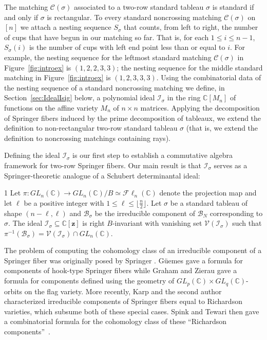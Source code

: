 \documentclass[11pt]{amsart}
\theoremstyle{remark}
\theoremstyle{remark}
\theoremstyle{definition}
\theoremstyle{definition}
\theoremstyle{definition}
\numberwithin{equation}{section}
\newcommand{\C}{\mathbb{C}}           %
\newcommand{\gs}{\sigma}
\newcommand{\cb}{\mathcal{B}}
\newcommand{\cc}{\mathcal{C}}
\newcommand{\ci}{\mathcal{I}}
\newcommand{\cv}{\mathcal{V}}
\newcommand{\SF}{\mathcal{B}}
\newcommand{\cupsigma}{\cc(\gs)}
\newcommand{\isigma}{\ci_\gs}
\newcommand{\Fl}{\mathcal{F}\ell}
\begin{document}
 
The matching $\cupsigma$ associated to a two-row standard tableau $\gs$ is standard if and only if $\gs$ is rectangular.  To every standard noncrossing matching $\cupsigma$ on $[n]$ we attach a nesting sequence $S_\gs$ that counts, from left to right, the number of cups that have begun in our matching so far. That is, for each $1\leq i \leq n-1$, $S_\gs(i)$ is the number of cups with left end point less than or equal to $i$. For example, the nesting sequence for the leftmost standard matching $\cupsigma$ in Figure~\ref{fig:introex} is $(1,2,2,3,3)$; the nesting sequence for the middle standard matching in Figure~\ref{fig:introex} is $(1,2,3,3,3)$. Using the combinatorial data of the nesting sequence of a standard noncrossing matching we define, in Section~\ref{sec:IdealIsig} below, a polynomial ideal $\ci_\gs$ in the ring $\C[M_n]$ of functions on the affine variety $M_n$ of $n\times n$ matrices. Applying the decomposition of Springer fibers induced by the prime decomposition of tableaux, we extend the definition to non-rectangular two-row standard tableau $\gs$ (that is, we extend the definition to noncrossing matchings containing rays). 



Defining the ideal $\ci_\gs$ is our first step to establish a commutative algebra framework for two-row Springer fibers.   Our main result is that $\isigma$ serves as a Springer-theoretic analogue of a Schubert determinantal ideal:

\begin{customthm}{1} \label{thm.intro}
Let $\pi: GL_n(\C) \to GL_n(\C)/B\simeq \Fl_n(\C)$ denote the projection map and let $\ell$ be a positive integer with $1\leq \ell \leq \lfloor \frac{n}{2}\rfloor$. Let  $\gs$ be a standard tableau of shape $(n-\ell, \ell)$ and $\cb_\gs$ be the irreducible component of $\SF_N$ corresponding to $\gs$. The ideal $\ci_\gs\subseteq \C[\mathbf{z}]$ is right $B$-invariant with vanishing set $\cv(\ci_\gs)$ such that $\pi^{-1}(\cb_\sigma) = \cv(\ci_\gs)\cap GL_n(\C)$. 
\end{customthm}

The problem of computing the cohomology class of an irreducible component of a Springer fiber was originally posed by Springer \cite{Springer1983}.  G\"uemes gave a formula for components of hook-type Springer fibers while Graham and Zierau \cite{Graham2011} gave a formula for components defined using the geometry of $GL_p(\C)\times GL_q(\C)$-orbits on the flag variety. More recently, Karp and the second author~\cite{KarpPrecup25} characterized irreducible components of Springer fibers equal to Richardson varieties, which subsume both of these special cases. Spink and Tewari then gave a combinatorial formula for the cohomology class of these ``Richardson components''~\cite{SpinkTewari25}. 
\end{document}
